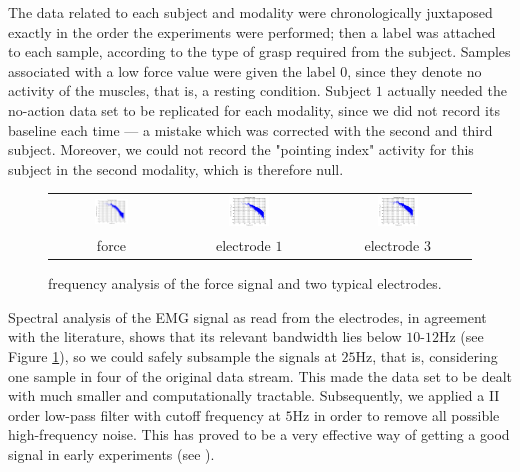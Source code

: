 The data related to each subject and modality were chronologically
juxtaposed exactly in the order the experiments were performed; then a
label was attached to each sample, according to the type of grasp
required from the subject. Samples associated with a low force value
were given the label $0$, since they denote no activity of the
muscles, that is, a resting condition. Subject $1$ actually needed the
no-action data set to be replicated for each modality, since we did
not record its baseline each time --- a mistake which was corrected
with the second and third subject. Moreover, we could not record the
"pointing index" activity for this subject in the second modality,
which is therefore null.

\begin{figure}[!ht] \centering
  \begin{tabular}{ccc}
    \includegraphics[width=0.3\textwidth]{figs/spectrum_force} &
    \includegraphics[width=0.3\textwidth]{figs/spectrum_electrode_1} &
    \includegraphics[width=0.3\textwidth]{figs/spectrum_electrode_3} \\
    force & electrode $1$ & electrode $3$ \\
  \end{tabular}
  \caption{frequency analysis of the force signal and two
    typical electrodes.}
  \label{fig:spectra}
\end{figure}

Spectral analysis of the EMG signal as read from the electrodes, in
agreement with the literature, shows that its relevant bandwidth lies
below $10$-$12$Hz (see Figure \ref{fig:spectra}), so we could safely
subsample the signals at $25$Hz, that is, considering one sample in
four of the original data stream. This made the data set to be dealt
with much smaller and computationally tractable. Subsequently, we
applied a II order low-pass filter with cutoff frequency at $5$Hz in
order to remove all possible high-frequency noise. This has proved to
be a very effective way of getting a good signal in early experiments
(see \cite{2008.Neurorob}).

